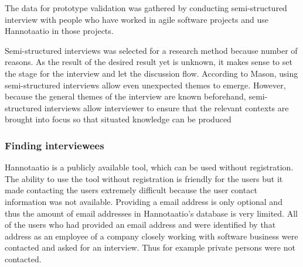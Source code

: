 \documentclass[english,12pt,a4paper,pdftex]{article}
\begin{document}

The data for prototype validation was gathered by conducting semi-structured interview with people who have worked in agile software projects and use Hannotaatio in those projects.

Semi-structured interviews was selected for a research method because number of reasons. As the result of the desired result yet is unknown, it makes sense to set the stage for the interview and let the discussion flow. According to Mason, using semi-structured interviews allow even unexpected themes to emerge. However, because the general themes of the interview are known beforehand, semi-structured interviews allow interviewer to ensure that the relevant contexts are brought into focus so that situated knowledge can be produced \citep{mason2004}

\subsubsection{Finding interviewees}

Hannotaatio is a publicly available tool, which can be used without registration. The ability to use the tool without registration is friendly for the users but it made contacting the users extremely difficult because the user contact information was not available. Providing a email address is only optional and thus the amount of email addresses in Hannotaatio's database is very limited. All of the users who had provided an email address and were identified by that address as an employee of a company closely working with software business were contacted and asked for an interview. Thus for example private persons were not contacted.
\end{document}
